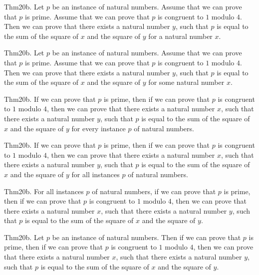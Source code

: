 \documentclass{article}
\begin{document}
Thm20b. Let $p$ be an instance of natural numbers. Assume that we can prove that $p$ is prime. Assume that we can prove that $p$ is congruent to $1$ modulo $4$. Then we can prove that there exists a natural number $y$, such that $p$ is equal to the sum of the square of $x$ and the square of $y$ for a natural number $x$.

Thm20b. Let $p$ be an instance of natural numbers. Assume that we can prove that $p$ is prime. Assume that we can prove that $p$ is congruent to $1$ modulo $4$. Then we can prove that there exists a natural number $y$, such that $p$ is equal to the sum of the square of $x$ and the square of $y$ for some natural number $x$.

Thm20b. If we can prove that $p$ is prime, then if we can prove that $p$ is congruent to $1$ modulo $4$, then we can prove that there exists a natural number $x$, such that there exists a natural number $y$, such that $p$ is equal to the sum of the square of $x$ and the square of $y$ for every instance $p$ of natural numbers.

Thm20b. If we can prove that $p$ is prime, then if we can prove that $p$ is congruent to $1$ modulo $4$, then we can prove that there exists a natural number $x$, such that there exists a natural number $y$, such that $p$ is equal to the sum of the square of $x$ and the square of $y$ for all instances $p$ of natural numbers.

Thm20b. For all instances $p$ of natural numbers, if we can prove that $p$ is prime, then if we can prove that $p$ is congruent to $1$ modulo $4$, then we can prove that there exists a natural number $x$, such that there exists a natural number $y$, such that $p$ is equal to the sum of the square of $x$ and the square of $y$.

Thm20b. Let $p$ be an instance of natural numbers. Then if we can prove that $p$ is prime, then if we can prove that $p$ is congruent to $1$ modulo $4$, then we can prove that there exists a natural number $x$, such that there exists a natural number $y$, such that $p$ is equal to the sum of the square of $x$ and the square of $y$.
\end{document}
